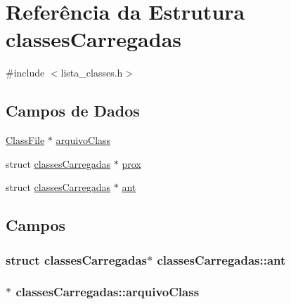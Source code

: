 \hypertarget{structclassesCarregadas}{}\section{Referência da Estrutura classes\+Carregadas}
\label{structclassesCarregadas}


{\ttfamily \#include $<$lista\+\_\+classes.\+h$>$}

\subsection*{Campos de Dados}
\begin{DoxyCompactItemize}
\item 
\hyperlink{classFileStruct_8h_aed419e54ca9f7e5ab3b22a3036af9993}{Class\+File} $\ast$ \hyperlink{structclassesCarregadas_a0bd56a3a1fe9cef7e3cd63a947cb2edb}{arquivo\+Class}
\item 
struct \hyperlink{structclassesCarregadas}{classes\+Carregadas} $\ast$ \hyperlink{structclassesCarregadas_a9be874f129111fad8157f3e4205e9e98}{prox}
\item 
struct \hyperlink{structclassesCarregadas}{classes\+Carregadas} $\ast$ \hyperlink{structclassesCarregadas_a2a075e91c50be2dbf5218507e5043a8e}{ant}
\end{DoxyCompactItemize}


\subsection{Campos}
\subsubsection[{\texorpdfstring{ant}{ant}}]{\setlength{\rightskip}{0pt plus 5cm}struct {\bf classes\+Carregadas}$\ast$ classes\+Carregadas\+::ant}\hypertarget{structclassesCarregadas_a2a075e91c50be2dbf5218507e5043a8e}{}\label{structclassesCarregadas_a2a075e91c50be2dbf5218507e5043a8e}
\subsubsection[{\texorpdfstring{arquivo\+Class}{arquivoClass}}]{$\ast$ classes\+Carregadas\+::arquivo\+Class}\hypertarget{structclassesCarregadas_a0bd56a3a1fe9cef7e3cd63a947cb2edb}{}\label{structclassesCarregadas_a0bd56a3a1fe9cef7e3cd63a947cb2edb}
